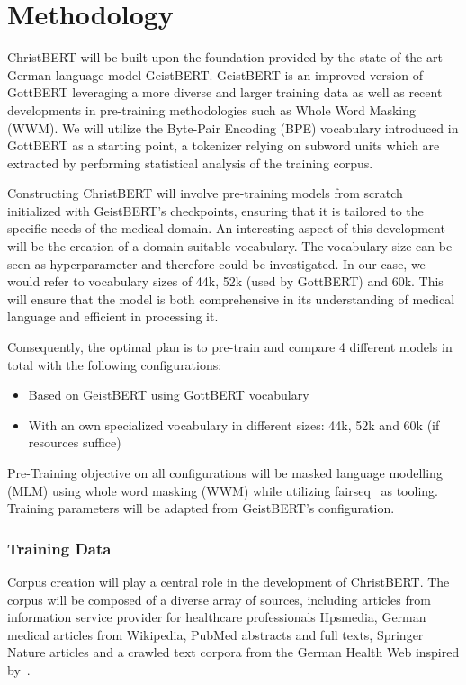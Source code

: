 \chapter*{Methodology}\label{chapter:methodology}

ChristBERT will be built upon the foundation provided by the state-of-the-art
German language model GeistBERT. GeistBERT is an improved version of GottBERT
leveraging a more diverse and larger training data as well as recent
developments in pre-training methodologies such as Whole Word Masking (WWM). We
will utilize the Byte-Pair Encoding (BPE) vocabulary introduced in GottBERT as a
starting point, a tokenizer relying on subword units which are extracted by
performing statistical analysis of the training corpus.

Constructing ChristBERT will involve pre-training models from scratch
initialized with GeistBERT's checkpoints, ensuring that it is tailored to the
specific needs of the medical domain. An interesting aspect of this development
will be the creation of a domain-suitable vocabulary. The vocabulary size can be
seen as hyperparameter and therefore could be investigated. In our case, we
would refer to vocabulary sizes of 44k, 52k (used by GottBERT) and 60k. This
will ensure that the model is both comprehensive in its understanding of medical
language and efficient in processing it.

Consequently, the optimal plan is to pre-train and compare 4 different models in
total with the following configurations:

\begin{itemize}
    \item Based on GeistBERT using GottBERT vocabulary
    \item With an own specialized vocabulary in different sizes: 44k, 52k and
    60k (if resources suffice)
\end{itemize}

Pre-Training objective on all configurations will be masked language modelling
(MLM) using whole word masking (WWM) while utilizing
fairseq~\cite{ott2019fairseq} as tooling. Training parameters will be adapted
from GeistBERT's configuration.

\subsection*{Training Data}

Corpus creation will play a central role in the development of ChristBERT. The
corpus will be composed of a diverse array of sources, including articles from
information service provider for healthcare professionals Hpsmedia, German
medical articles from Wikipedia, PubMed abstracts and full texts, Springer
Nature articles and a crawled text corpora from the German Health Web inspired
by~\cite{zowalla2020crawling}. 

